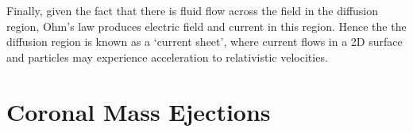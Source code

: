 Finally, given the fact that there is fluid flow across the field in the diffusion region, Ohm's law produces electric field and current in this region. Hence the the diffusion region is known as a `current sheet', where current flows in a 2D surface and particles may experience acceleration to relativistic velocities.



\section{Coronal Mass Ejections}\label{sec:2}

